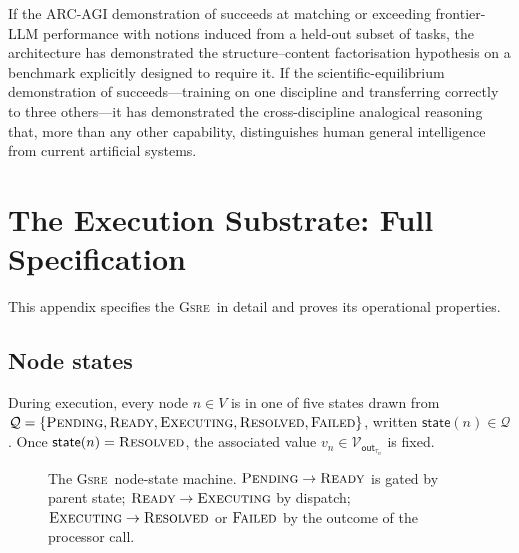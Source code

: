 \documentclass[11pt,a4paper]{article}
\theoremstyle{plain}
\theoremstyle{definition}
\theoremstyle{remark}
\newcommand{\Val}{\mathcal{V}}
\newcommand{\NState}{\mathsf{state}}
\newcommand{\GSRE}{\textsc{Gsre}}
\newcommand{\NodeProc}{\mathsf{NodeProc}}
\newcommand{\PENDING}{\textsc{Pending}}
\newcommand{\READY}{\textsc{Ready}}
\newcommand{\EXEC}{\textsc{Executing}}
\newcommand{\RESOLVED}{\textsc{Resolved}}
\newcommand{\FAILED}{\textsc{Failed}}
\begin{document}
If the ARC-AGI demonstration of  succeeds at matching or exceeding frontier-LLM performance with notions induced from a held-out subset of tasks, the architecture has demonstrated the structure--content factorisation hypothesis on a benchmark explicitly designed to require it. If the scientific-equilibrium demonstration of  succeeds---training on one discipline and transferring correctly to three others---it has demonstrated the cross-discipline analogical reasoning that, more than any other capability, distinguishes human general intelligence from current artificial systems.

\appendix

\section{The Execution Substrate: Full Specification}
\label{app:executor}

This appendix specifies the \GSRE\ in detail and proves its operational properties.

\subsection{Node states}

During execution, every node $n \in V$ is in one of five states drawn from $\mathcal{Q} = \{\PENDING, \READY, \EXEC, \RESOLVED, \FAILED\}$, written $\NState(n) \in \mathcal{Q}$. Once $\NState(n) = \RESOLVED$, the associated value $v_n \in \Val_{\mathsf{out}_{\tau_n}}$ is fixed.

\begin{figure}[ht]
\centering
{}
\caption{The \GSRE\ node-state machine. $\PENDING \to \READY$ is gated by parent state; $\READY \to \EXEC$ by dispatch; $\EXEC \to \RESOLVED$ or $\FAILED$ by the outcome of the processor call.}
\label{fig:state-machine}
\end{figure}
\end{document}
